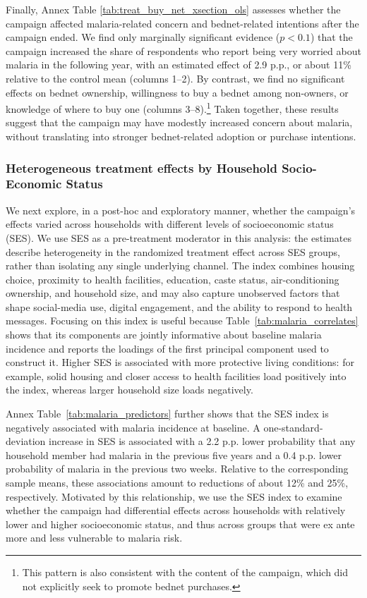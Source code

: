 Finally, Annex Table \ref{tab:treat_buy_net_xsection_ols} assesses whether the campaign affected malaria-related concern and bednet-related intentions after the campaign ended. We find only marginally significant evidence ($p<0.1$) that the campaign increased the share of respondents who report being very worried about malaria in the following year, with an estimated effect of 2.9 p.p., or about 11\% relative to the control mean (columns 1–2). By contrast, we find no significant effects on bednet ownership, willingness to buy a bednet among non-owners, or knowledge of where to buy one (columns 3–8).\footnote{This pattern is also consistent with the content of the campaign, which did not explicitly seek to promote bednet purchases.} Taken together, these results suggest that the campaign may have modestly increased concern about malaria, without translating into stronger bednet-related adoption or purchase intentions.



\subsubsection{Heterogeneous treatment effects by Household Socio-Economic Status}

We next explore, in a post-hoc and exploratory manner, whether the campaign’s effects varied across households with different levels of socioeconomic status (SES). We use SES as a pre-treatment moderator in this analysis: the estimates describe heterogeneity in the randomized treatment effect across SES groups, rather than isolating any single underlying channel. The index combines housing choice, proximity to health facilities, education, caste status, air-conditioning ownership, and household size, and may also capture unobserved factors that shape social-media use, digital engagement, and the ability to respond to health messages. Focusing on this index is useful because Table~\ref{tab:malaria_correlates} shows that its components are jointly informative about baseline malaria incidence and reports the loadings of the first principal component used to construct it. Higher SES is associated with more protective living conditions: for example, solid housing and closer access to health facilities load positively into the index, whereas larger household size loads negatively.

Annex Table~\ref{tab:malaria_predictors} further shows that the SES index is negatively associated with malaria incidence at baseline. A one-standard-deviation increase in SES is associated with a 2.2 p.p. lower probability that any household member had malaria in the previous five years and a 0.4 p.p. lower probability of malaria in the previous two weeks. Relative to the corresponding sample means, these associations amount to reductions of about 12\% and 25\%, respectively. Motivated by this relationship, we use the SES index to examine whether the campaign had differential effects across households with relatively lower and higher socioeconomic status, and thus across groups that were ex ante more and less vulnerable to malaria risk.

